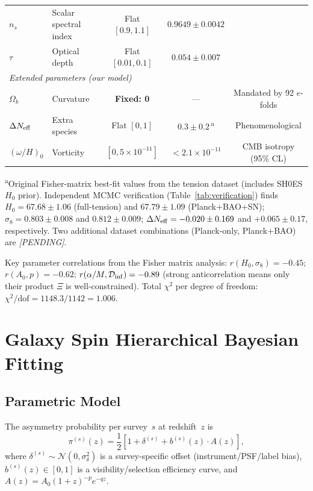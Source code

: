 \documentclass[aps,prd,twocolumn,superscriptaddress,showpacs,preprintnumbers,nofootinbib,longbibliography,floatfix]{revtex4-2}
\newcommand{\Dinf}{\mathcal{D}_{\rm inf}}
\newcommand{\Neff}{N_{\rm eff}}
\begin{document}
\begin{table}[t]
\begin{ruledtabular}
\begin{tabular}{llccc}
$n_s$ & Scalar spectral index & Flat $[0.9,1.1]$ & $0.9649 \pm 0.0042$ & \\
$\tau$ & Optical depth & Flat $[0.01,0.1]$ & $0.054 \pm 0.007$ & \\
\hline
\multicolumn{5}{l}{\textit{Extended parameters (our model)}} \\
$\Omega_k$ & Curvature & \textbf{Fixed: 0} & --- & Mandated by 92 $e$-folds \\
$\Delta \Neff$ & Extra species & Flat $[0,1]$ & $0.3\pm 0.2$\,\textsuperscript{a} & Phenomenological \\
$(\omega/H)_0$ & Vorticity & $[0,5\times 10^{-11}]$ & $< 2.1\times 10^{-11}$ & CMB isotropy (95\% CL) \\
\end{tabular}
\end{ruledtabular}
\end{table}

\textsuperscript{a}Original Fisher-matrix best-fit values from the tension dataset (includes SH0ES $H_0$ prior). Independent MCMC verification (Table~\ref{tab:verification}) finds $H_0 = 67.68 \pm 1.06$ (full-tension) and $67.79 \pm 1.09$ (Planck+BAO+SN); $\sigma_8 = 0.803 \pm 0.008$ and $0.812 \pm 0.009$; $\Delta\Neff = -0.020 \pm 0.169$ and $+0.065 \pm 0.17$, respectively. Two additional dataset combinations (Planck-only, Planck+BAO) are \textit{[PENDING]}.

Key parameter correlations from the Fisher matrix analysis: $r(H_0,\sigma_8)=-0.45$; $r(A_0,p)=-0.62$; $r(\alpha/M,\Dinf)=-0.89$ (strong anticorrelation means only their product $\Xi$ is well-constrained). Total $\chi^2$ per degree of freedom: $\chi^2/\text{dof}=1148.3/1142=1.006$.


\section{Galaxy Spin Hierarchical Bayesian Fitting}\label{app:galaxy}

\subsection{Parametric Model}

The asymmetry probability per survey~$s$ at redshift~$z$ is
\begin{equation}\label{eq:pi_app}
\pi^{(s)}(z)=\frac{1}{2}\left[1+\delta^{(s)}+b^{(s)}(z)\cdot A(z)\right],
\end{equation}
where $\delta^{(s)}\sim\mathcal{N}(0,\sigma_\delta^2)$ is a survey-specific offset (instrument/PSF/label bias), $b^{(s)}(z)\in[0,1]$ is a visibility/selection efficiency curve, and $A(z) = A_0(1+z)^{-p}e^{-qz}$.
\end{document}

